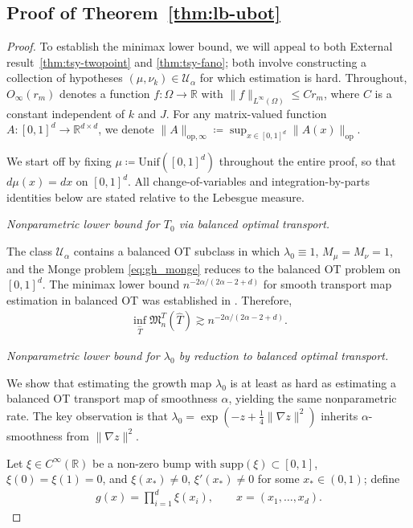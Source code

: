 \documentclass[11pt,reqno]{amsart}
\theoremstyle{definition}
\newcommand{\R}{\mathbb{R}}
\renewcommand{\hat}{\widehat}
\newcommand{\supp}{\mathrm{supp}}
\begin{document}
\subsection{Proof of Theorem~\ref{thm:lb-ubot}}
\begin{proof}
To establish the minimax lower bound, we will appeal to both External result~\ref{thm:tsy-twopoint} and \ref{thm:tsy-fano}; both involve constructing a collection of hypotheses $(\mu,\nu_k)\in\mathcal U_\alpha$ for which estimation is hard. Throughout, $O_\infty(r_m)$ denotes a function $f:\Omega\to\R$ with $\|f\|_{L^\infty(\Omega)}\le C r_m$, where $C$ is a constant independent of $k$ and $J$. For any matrix-valued function $A:[0,1]^d \to \R^{d\times d}$, we denote $\| A \|_{\mathrm{op},\infty} \coloneqq \sup_{x\in [0,1]^d} \| A(x) \|_{\mathrm{op}}$.

We start off by fixing $\mu\coloneqq\mathrm{Unif}([0,1]^d)$ throughout the entire proof, so that $d\mu(x)=dx$ on $[0,1]^d$. All change-of-variables and integration-by-parts identities below are stated relative to the Lebesgue measure.

\smallskip
\noindent\emph{Nonparametric lower bound for $T_0$ via balanced optimal transport.}

The class $\mathcal U_\alpha$ contains a balanced OT subclass in which $\lambda_0\equiv 1$, $M_\mu=M_\nu=1$, and the Monge problem \eqref{eq:gh_monge} reduces to the balanced OT problem on $[0,1]^d$. The minimax lower bound $n^{-2\alpha/(2\alpha-2+d)}$ for smooth transport map estimation in balanced OT was established in \cite{hutter2021minimax}. Therefore,
\begin{align}
    \label{eq:lb-T-nonpar}
    \inf_{\hat T} \mathfrak M_n^T(\hat T)  \gtrsim  n^{-2\alpha/(2\alpha-2+d)}.
\end{align}

\smallskip
\noindent\emph{Nonparametric lower bound for $\lambda_0$ by reduction to balanced optimal transport.}

We show that estimating the growth map $\lambda_0$ is at least as hard as estimating a balanced OT transport map of smoothness $\alpha$, yielding the same nonparametric rate. The key observation is that $\lambda_0=\exp(-z+\frac1{4}\|\nabla z\|^2)$ inherits $\alpha$-smoothness from $\|\nabla z\|^2$.

Let $\xi\in C^\infty(\R)$ be a non-zero bump with $\supp(\xi)\subset[0,1]$, $\xi(0)=\xi(1)=0$, and $\xi(x_*)\ne 0$, $\xi'(x_*)\ne 0$ for some $x_*\in(0,1)$; define
\begin{align}
    g(x)=\prod_{i=1}^d\xi(x_i), \qquad x=(x_1,\dots,x_d).
\end{align}


\end{proof}
\end{document}
